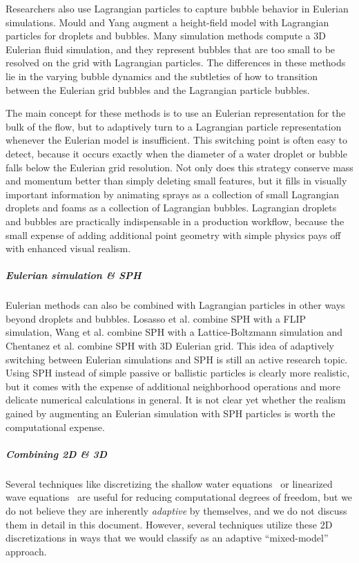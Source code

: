 Researchers also use Lagrangian particles to capture bubble behavior in Eulerian simulations. Mould and Yang \cite{Mould1997} augment a height-field model with Lagrangian particles for droplets and bubbles. Many simulation methods \cite{Greenwood:2004:BBE:1028523.1028562,Hong2008Bubbles,Patkar2013} compute a 3D Eulerian fluid simulation, and they represent bubbles that are too small to be resolved on the grid with Lagrangian particles. The differences in these methods lie in the varying bubble dynamics and the subtleties of how to transition between the Eulerian grid bubbles and the Lagrangian particle bubbles.

The main concept for these methods is to use an Eulerian representation for the bulk of the flow, but to adaptively turn to a Lagrangian particle representation whenever the Eulerian model is insufficient. This switching point is often easy to detect, because it occurs exactly when the diameter of a water droplet or bubble falls below the Eulerian grid resolution. Not only does this strategy conserve mass and momentum better than simply deleting small features, but it fills in visually important information by animating sprays as a collection of small Lagrangian droplets and foams as a collection of Lagrangian bubbles. Lagrangian droplets and bubbles are practically indispensable in a production workflow, because the small expense of adding additional point geometry with simple physics pays off with enhanced visual realism.

\subparagraph*{Eulerian simulation \& SPH}
Eulerian methods can also be combined with Lagrangian particles in other ways beyond droplets and bubbles.
Losasso et al. \cite{Losasso2008} combine SPH with a FLIP simulation, Wang et al. \cite{Wang2013} combine SPH with a Lattice-Boltzmann simulation and Chentanez et al. \cite{Chentanez2014} combine SPH with 3D Eulerian grid.
This idea of adaptively switching between Eulerian simulations and SPH is still an active research topic. Using SPH instead of simple passive or ballistic particles is clearly more realistic, but it comes with the expense of additional neighborhood operations and more delicate numerical calculations in general. It is not clear yet whether the realism gained by augmenting an Eulerian simulation with SPH particles is worth the computational expense.

\subparagraph*{Combining 2D \& 3D}
Several techniques like discretizing the shallow water equations~\cite{layton2002numerically,hagen2005visual} or linearized wave equations~\cite{kass1990rapid,tessendorf2004interactive,keeler2014ocean} are useful for reducing computational degrees of freedom, but we do not believe they are inherently {\em adaptive} by themselves, and we do not discuss them in detail in this document. However, several techniques utilize these 2D discretizations in ways that we would classify as an adaptive ``mixed-model'' approach.

